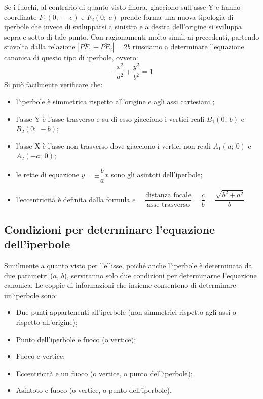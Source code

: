 Se i fuochi, al contrario di quanto visto finora, giacciono sull'asse Y e 
hanno coordinate \( F_{1} (0;~-c)\) e \( F_{2} (0;~c)\) prende forma una nuova 
tipologia di iperbole che invece di svilupparsi a sinistra e a destra 
dell'origine si sviluppa sopra e sotto di tale punto.
Con ragionamenti molto simili ai precedenti, partendo stavolta dalla relazione 
\(\left|\overline{PF_{1}}-\overline{PF_{2}}\right|=2b\) riusciamo a 
determinare l'equazione canonica di questo tipo di iperbole, ovvero: 
\begin{equation}
-\dfrac{x^{2}}{a^{2}}+\dfrac{y^{2}}{b^{2}}=1
\end{equation}
Si può facilmente verificare che:
\begin{itemize} [noitemsep]
  \item l'iperbole è simmetrica rispetto all'origine e agli assi 
cartesiani ;
  \item l'asse Y è l'asse trasverso e su di esso giacciono i vertici 
reali \( B_{1} (0;~b)\) e \( B_{2} (0;~-b)\);
  \item l'asse X è l'asse non trasverso dove giacciono i vertici non 
reali \( A_{1} (a;~0)\) e \( A_{2} (-a;~0)\);
  \item le rette di equazione \(y= \pm \dfrac{b}{a}  x\) sono gli asintoti dell'iperbole;
  \item l'eccentricità è definita dalla formula 
\(e=\dfrac{\text{distanza focale}}{\text{asse trasverso}}=
\dfrac{c}{b}=\dfrac{\sqrt{b^{2}+a^{2}}}{b} \)
\end{itemize}

\subsection{Condizioni per determinare l'equazione dell'iperbole}

Similmente a quanto visto per l'ellisse, poiché anche l'iperbole 
è determinata da due parametri (\(a\), \(b\)), serviranno solo due condizioni per 
determinarne l'equazione canonica.
Le coppie di informazioni che insieme consentono di determinare un'iperbole 
sono:
\begin{itemize}[noitemsep]
\item Due punti appartenenti all'iperbole (non simmetrici rispetto 
agli assi o rispetto all'origine);
\item Punto dell'iperbole e fuoco (o vertice);
\item Fuoco e vertice;
\item Eccentricità e un fuoco (o vertice, o punto dell'iperbole);
\item Asintoto e fuoco (o vertice, o punto dell'iperbole).
\end{itemize}

